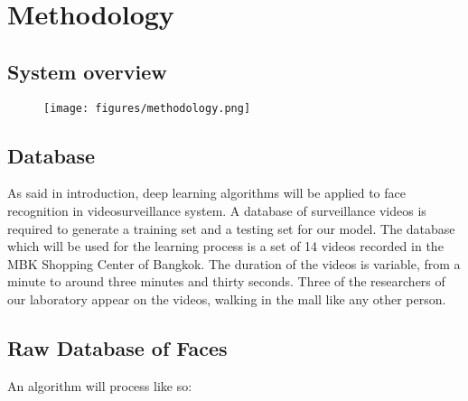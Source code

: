 \setlength{\footskip}{8mm}

\chapter{Methodology}
\label{ch:methodology}

\section{System overview}

\begin{figure}[t]
  \centering
  \texttt{[image: figures/methodology.png]}  
  \caption[A general representation of ]{}
  \label{fig:Methodology}
\end{figure}


\section{Database}
As said in introduction, deep learning algorithms will be applied to face recognition in videosurveillance system. A database of surveillance videos is required to generate a training set and a testing set for our model.
The database which will be used for the learning process is a set of 14 videos recorded in the MBK Shopping Center of Bangkok. The duration of the videos is variable, from a minute to around three minutes and thirty seconds. Three of the researchers of our laboratory appear on the videos, walking in the mall like any other person.

\section{Raw Database of Faces}
An algorithm will process like so:

